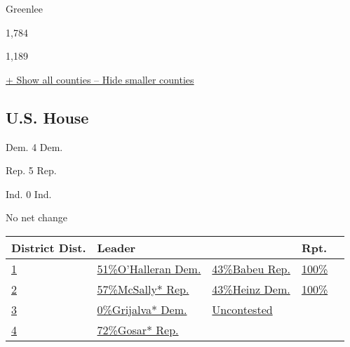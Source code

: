 Greenlee

1,784

1,189

\protect\hyperlink{}{+ Show all counties -- Hide smaller counties}

\hypertarget{us-house}{%
\subsection{U.S. House}\label{us-house}}

Dem. 4 Dem.

Rep. 5 Rep.

Ind. 0 Ind.

No net change

\begin{longtable}[]{@{}lllll@{}}
\toprule
District Dist. & Leader & & Rpt. &\tabularnewline
\midrule
\endhead
\href{//www.nytimes.com/elections/2016/results/arizona-house-district-1-ohalleran-babeu}{1}
&
\href{//www.nytimes.com/elections/2016/results/arizona-house-district-1-ohalleran-babeu}{
51\%O'Halleran Dem.} &
\href{//www.nytimes.com/elections/2016/results/arizona-house-district-1-ohalleran-babeu}{
43\%Babeu Rep.} &
\href{//www.nytimes.com/elections/2016/results/arizona-house-district-1-ohalleran-babeu}{100\%}
&
\href{//www.nytimes.com/elections/2016/results/arizona-house-district-1-ohalleran-babeu}{}\tabularnewline
\href{//www.nytimes.com/elections/2016/results/arizona-house-district-2-mcsally-heinz}{2}
&
\href{//www.nytimes.com/elections/2016/results/arizona-house-district-2-mcsally-heinz}{
57\%McSally* Rep.} &
\href{//www.nytimes.com/elections/2016/results/arizona-house-district-2-mcsally-heinz}{
43\%Heinz Dem.} &
\href{//www.nytimes.com/elections/2016/results/arizona-house-district-2-mcsally-heinz}{100\%}
&
\href{//www.nytimes.com/elections/2016/results/arizona-house-district-2-mcsally-heinz}{}\tabularnewline
\href{//www.nytimes.com/elections/2016/results/arizona-house-district-3}{3}
&
\href{//www.nytimes.com/elections/2016/results/arizona-house-district-3}{
0\%Grijalva* Dem.} &
\href{//www.nytimes.com/elections/2016/results/arizona-house-district-3}{Uncontested}
&
\href{//www.nytimes.com/elections/2016/results/arizona-house-district-3}{}
&
\href{//www.nytimes.com/elections/2016/results/arizona-house-district-3}{}\tabularnewline
\href{//www.nytimes.com/elections/2016/results/arizona-house-district-4-gosar-weisser}{4}
&
\href{//www.nytimes.com/elections/2016/results/arizona-house-district-4-gosar-weisser}{
72\%Gosar* Rep.} &
\href{//www.nytimes.com/elections/2016/results/arizona-house-district-4-gosar-weisser}{
}
\end{longtable}
